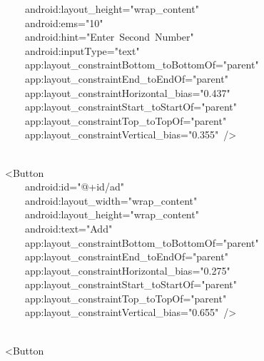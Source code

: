 {\ttfamily\small \ \ \ \ \ \ \ \ android:layout\_height="wrap\_content"} \\
{\ttfamily\small \ \ \ \ \ \ \ \ android:ems="10"} \\
{\ttfamily\small \ \ \ \ \ \ \ \ android:hint="Enter\ Second\ Number"} \\
{\ttfamily\small \ \ \ \ \ \ \ \ android:inputType="text"} \\
{\ttfamily\small \ \ \ \ \ \ \ \ app:layout\_constraintBottom\_toBottomOf="parent"} \\
{\ttfamily\small \ \ \ \ \ \ \ \ app:layout\_constraintEnd\_toEndOf="parent"} \\
{\ttfamily\small \ \ \ \ \ \ \ \ app:layout\_constraintHorizontal\_bias="0.437"} \\
{\ttfamily\small \ \ \ \ \ \ \ \ app:layout\_constraintStart\_toStartOf="parent"} \\
{\ttfamily\small \ \ \ \ \ \ \ \ app:layout\_constraintTop\_toTopOf="parent"} \\
{\ttfamily\small \ \ \ \ \ \ \ \ app:layout\_constraintVertical\_bias="0.355"\ /\textgreater{}} \\
\strut \\
{\ttfamily\small \ \ \ \ \textless{}Button} \\
{\ttfamily\small \ \ \ \ \ \ \ \ android:id="@+id/ad"} \\
{\ttfamily\small \ \ \ \ \ \ \ \ android:layout\_width="wrap\_content"} \\
{\ttfamily\small \ \ \ \ \ \ \ \ android:layout\_height="wrap\_content"} \\
{\ttfamily\small \ \ \ \ \ \ \ \ android:text="Add"} \\
{\ttfamily\small \ \ \ \ \ \ \ \ app:layout\_constraintBottom\_toBottomOf="parent"} \\
{\ttfamily\small \ \ \ \ \ \ \ \ app:layout\_constraintEnd\_toEndOf="parent"} \\
{\ttfamily\small \ \ \ \ \ \ \ \ app:layout\_constraintHorizontal\_bias="0.275"} \\
{\ttfamily\small \ \ \ \ \ \ \ \ app:layout\_constraintStart\_toStartOf="parent"} \\
{\ttfamily\small \ \ \ \ \ \ \ \ app:layout\_constraintTop\_toTopOf="parent"} \\
{\ttfamily\small \ \ \ \ \ \ \ \ app:layout\_constraintVertical\_bias="0.655"\ /\textgreater{}} \\
\strut \\
{\ttfamily\small \ \ \ \ \textless{}Button} \\
